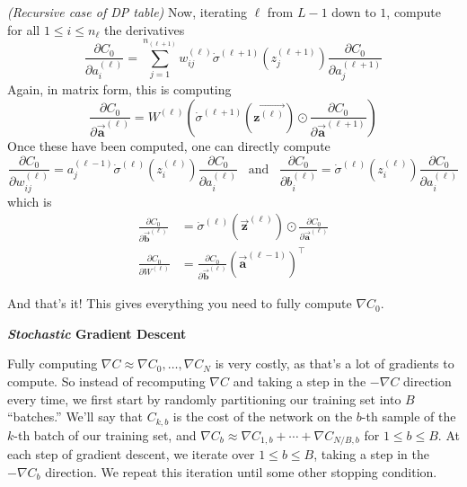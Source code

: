 \documentclass[12pt, letterpaper]{article}
\theoremstyle{definition}
\theoremstyle{remark}
\newcommand{\vect}[1]{\vec{\mathbf{#1}}}
\begin{document}
\emph{(Recursive case of DP table)} Now, iterating $\ell$ from $L - 1$ down to $1$, compute for all $1 \leq i \leq n_\ell$ the derivatives 
\[
    \frac{\partial C_0}{\partial a_i^{(\ell)}} = \sum_{j = 1}^{n_{(\ell + 1)}} w_{ij}^{(\ell)} \dot\sigma^{(\ell + 1)}(z_j^{(\ell + 1)}) \frac{\partial C_0}{\partial a_j^{(\ell + 1)}}
\]
Again, in matrix form, this is computing 
\[
    \frac{\partial C_0}{\partial \vect{a}^{(\ell)}} = W^{(\ell)} \left(\dot\sigma^{(\ell + 1)}\left(\vect{z^{(\ell)}}\right) \odot \frac{\partial C_0}{\partial \vect{a}^{(\ell + 1)}}\right)
\]
Once these have been computed, one can directly compute
\[
    \frac{\partial C_0}{\partial w_{ij}^{(\ell)}} = a_j^{(\ell - 1)} \dot\sigma^{(\ell)}(z_i^{(\ell)}) \frac{\partial C_0}{\partial a_i^{(\ell)}} \;\;\; \text{and} \;\;\; \frac{\partial C_0}{\partial b_i^{(\ell)}} = \dot\sigma^{(\ell)}(z_i^{(\ell)}) \frac{\partial C_0}{\partial a_i^{(\ell)}}
\]
which is 
\begin{align*}
    \frac{\partial C_0}{\partial \vect{b}^{(\ell)}} &= \dot\sigma^{(\ell)}(\vect{z}^{(\ell)}) \odot \frac{\partial C_0}{\partial \vect{a}^{(\ell)}} \\
    \frac{\partial C_0}{\partial W^{(\ell)}}        &= \frac{\partial C_0}{\partial \vect{b}^{(\ell)}} \left(\vect{a}^{(\ell - 1)}\right)^\top
\end{align*}

And that's it! This gives everything you need to fully compute $\nabla C_0$.

\begin{center}
    \textbf{\emph{Stochastic} Gradient Descent}
\end{center}

Fully computing $\nabla C \approx \nabla C_0, \ldots, \nabla C_N$ is very costly, as that's a lot of gradients to compute. So instead 
of recomputing $\nabla C$ and taking a step in the $-\nabla C$ direction every time, we first start by randomly partitioning 
our training set into $B$ ``batches.'' We'll say that $C_{k, b}$ is the cost of the network on the $b$-th sample of the $k$-th 
batch of our training set, and $\nabla C_b \approx \nabla C_{1, b} + \cdots + \nabla C_{N/B, b}$ for $1 \leq b \leq B$. 
At each step of gradient descent, we iterate over $1 \leq b \leq B$, taking a step in the $-\nabla C_b$ direction. 
We repeat this iteration until some other stopping condition.
\end{document}
